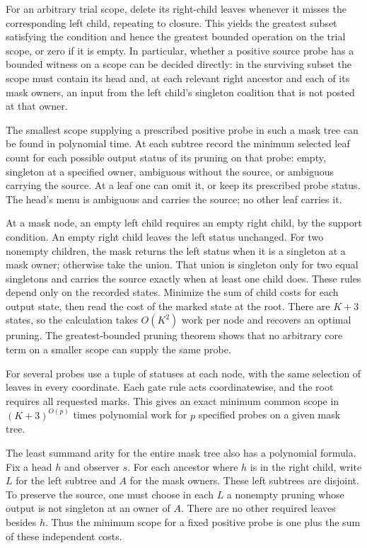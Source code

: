 For an arbitrary trial scope, delete its right-child leaves
whenever it misses the corresponding left child, repeating
to closure. This yields the greatest subset satisfying the
condition and hence the greatest bounded operation on the
trial scope, or zero if it is empty. In particular, whether
a positive source probe has a bounded witness on a scope
can be decided directly: in the surviving subset the scope
must contain its head and, at each relevant right ancestor
and each of its mask owners, an input from the left child's
singleton coalition that is not posted at that owner.

The smallest scope supplying a prescribed positive probe
in such a mask tree can be found in polynomial time. At
each subtree record the minimum selected leaf count for
each possible output status of its pruning on that probe:
empty, singleton at a specified owner, ambiguous without
the source, or ambiguous carrying the source. At a leaf
one can omit it, or keep its prescribed probe status.
The head's menu is ambiguous and carries the source; no
other leaf carries it.

At a mask node, an empty left child requires an empty
right child, by the support condition. An empty right
child leaves the left status unchanged. For two nonempty
children, the mask returns the left status when it is a
singleton at a mask owner; otherwise take the union.
That union is singleton only for two equal singletons and
carries the source exactly when at least one child does.
These rules depend only on the recorded states. Minimize
the sum of child costs for each output state, then read
the cost of the marked state at the root. There are
$K+3$ states, so the calculation takes $O(K^2)$ work per
node and recovers an optimal pruning. The greatest-bounded
pruning theorem shows that no arbitrary core term on a
smaller scope can supply the same probe.

For several probes use a tuple of statuses at each node,
with the same selection of leaves in every coordinate.
Each gate rule acts coordinatewise, and the root requires
all requested marks. This gives an exact minimum common
scope in $(K+3)^{O(p)}$ times polynomial work for $p$
specified probes on a given mask tree.

The least summand arity for the entire mask tree also has
a polynomial formula. Fix a head $h$ and observer $s$.
For each ancestor where $h$ is in the right child, write
$L$ for the left subtree and $A$ for the mask owners.
These left subtrees are disjoint. To preserve the source,
one must choose in each $L$ a nonempty pruning whose
output is not singleton at an owner of $A$. There are no
other required leaves besides $h$. Thus the minimum scope
for a fixed positive probe is one plus the sum of these
independent costs.


